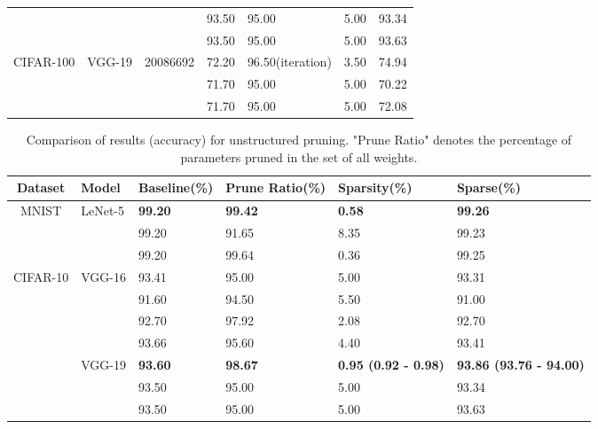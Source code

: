 \begin{table}[!htbp]
\begin{tabular}{c|l|l|l|l|l|l}
         & &    & 93.50 &    95.00\cite{han2015learning,liu2018rethinking} &    5.00   &    93.34\\
         & &    & 93.50 &    95.00\cite{liu2018rethinking} &    5.00   &    93.63\\\hline
        \multirow{3}{*}{CIFAR-100} &  \multirow{3}{*}{VGG-19}  &\multirow{3}{*}{20086692} & 72.20 &    96.50(iteration) &    3.50   &     74.94\\
        & &    & 71.70 &    95.00\cite{han2015learning,liu2018rethinking}  &    5.00   &     70.22\\
        & &    & 71.70 &    95.00\cite{liu2018rethinking}  &    5.00   &     72.08\\\hline
\end{tabular}
\end{table}

\begin{table}[!htbp]
	\caption{Comparison of results (accuracy) for unstructured pruning. "Prune Ratio" denotes the percentage of parameters pruned in the set of all weights. }
	\centering
	\begin{tabular}{c|l|l|l|l|l}
		\hline
		Dataset & Model & Baseline(\%) & Prune Ratio(\%)& Sparsity(\%)  & Sparse(\%) \\\hline 
	    \multirow{3}{*}{MNIST} &  \multirow{3}{*}{LeNet-5} & \textbf{99.20} & \textbf{99.42}  &   \textbf{0.58}   &    \textbf{99.26}\\
        & & 99.20 &    91.65\cite{han2015learning}  &    8.35  &    99.23 \\
        &   & 99.20 &    99.64\cite{molchanov2017variational} &    0.36  &    99.25\\\hline      
		\multirow{7}{*}{CIFAR-10} &  \multirow{4}{*}{VGG-16} & 93.41 &    95.00\cite{dettmers2019sparse} &    5.00   &    93.31\\
         &  & 91.60 &    94.50\cite{louizos2017bayesian} &    5.50   &    91.00\\
         &  & 92.70 &    97.92\cite{molchanov2017variational} &    2.08   &    92.70\\
         &  & 93.66 &    95.60\cite{liu2017learning} &    4.40   &    93.41\\\cline{2-6}
         &   \multirow{3}{*}{VGG-19} & \textbf{93.60} &    \textbf{98.67}  &    \textbf{0.95 (0.92 - 0.98)}  &    \textbf{93.86 (93.76 - 94.00)}\\
         &  & 93.50 &    95.00\cite{han2015learning,liu2018rethinking} &    5.00   &    93.34\\
         &  & 93.50 &    95.00\cite{liu2018rethinking} &    5.00   &    93.63\\\hline
\end{tabular}
\end{table}

